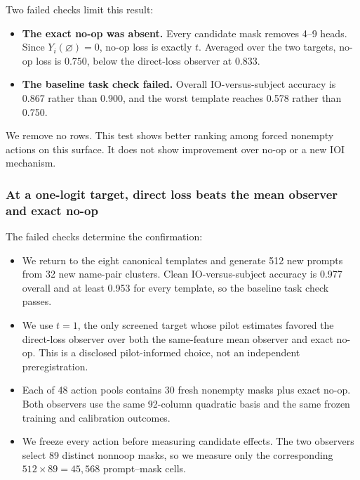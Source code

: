 

Two failed checks limit this result:

\begin{itemize}[itemsep=0.2em,topsep=0.25em]
  \item \textbf{The exact no-op was absent.} Every candidate mask
  removes 4--9 heads. Since $Y_i(\varnothing)=0$, no-op loss is exactly $t$.
  Averaged over the two targets, no-op loss is $0.750$, below the direct-loss
  observer at $0.833$.
  \item \textbf{The baseline task check failed.} Overall IO-versus-subject accuracy is
  0.867 rather than 0.900, and the worst template reaches 0.578 rather than
  0.750.
\end{itemize}

We remove no rows. This test shows better ranking among forced nonempty actions
on this surface. It does not show improvement over no-op or a new IOI
mechanism.

\subsubsection{At a one-logit target, direct loss beats the mean observer and exact no-op}
\label{sec:phase7-confirmation}

The failed checks determine the confirmation:

\begin{itemize}
  \item We return to the eight canonical templates and generate 512 new prompts
  from 32 new name-pair clusters. Clean IO-versus-subject accuracy is 0.977
  overall and at least 0.953 for every template, so the baseline task check
  passes.
  \item We use $t=1$, the only screened target whose pilot estimates favored
  the direct-loss observer over both the same-feature mean observer and exact
  no-op. This is a disclosed pilot-informed choice, not an independent
  preregistration.
  \item Each of 48 action pools contains 30 fresh nonempty masks plus exact
  no-op. Both observers use the same 92-column quadratic basis and the same
  frozen training and calibration outcomes.
  \item We freeze every action before measuring candidate effects. The two
  observers select 89 distinct nonnoop masks, so we measure only the
  corresponding $512\times89=45{,}568$ prompt--mask cells.
\end{itemize}

